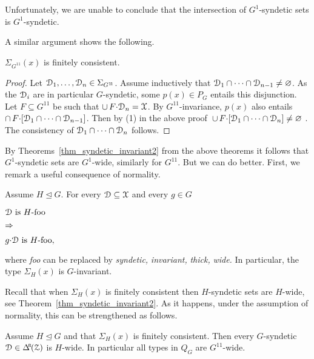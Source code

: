 Unfortunately, we are unable to conclude that the intersection of $G^1$-syndetic sets is $G^1$-syndetic.

A similar argument shows the following.

\begin{theorem}\label{thm_gammaP}
   $\Sigma_{G^{1\!1}}(x)$ is finitely consistent.
\end{theorem}

\begin{proof}
  \def\medrel#1{\parbox[t]{5ex}{$\displaystyle\hfil #1$}}
  \def\ceq#1#2#3{\parbox[t]{23ex}{$\displaystyle #1$}\medrel{#2}{$\displaystyle #3$}}   
  Let $\EuScript D_1,\dots,\EuScript D_n\in\Sigma_{G^{1\!1}}$.
  Assume inductively that $\EuScript D_1\cap\dots\cap\EuScript D_{n-1}\neq\varnothing$.
  As the $\EuScript D_i$ are in particular $G$-syndetic, some $p(x)\in P_G$ entails this disjunction.
  Let $F\subseteq G^{1\!1}$ be such that $\cup\,F{\cdot}\EuScript D_n=\EuScript X$.
  By $G^{1\!1}$-invariance, $p(x)$ also entails $\cap\, F{\cdot}[\EuScript D_1\cap\dots\cap\EuScript D_{n-1}]$.
  Then by (1) in the above proof $\,\cup\,F{\cdot}[\EuScript D_1\cap\dots\cap\EuScript D_n]\neq\varnothing$ .
  The consistency of $\EuScript D_1\cap\dots\cap\EuScript D_n$ follows.
\end{proof}

By Theorems~\ref{thm_syndetic_invariant2} from the above theorems it follows that $G^1$-syndetic sets are $G^1$-wide, similarly for $G^{1\!1}$.
But we can do better.
First, we remark a useful consequence of normality.

\begin{remark}\label{rem_invariance_normalsubg}
\def\medrel#1{\parbox[t]{5ex}{$\displaystyle\hfil #1$}}
\def\ceq#1#2#3{\parbox[t]{20ex}{$\displaystyle #1$}\medrel{#2}{$\displaystyle #3$}}
  Assume $H\trianglelefteq G$.
  For every $\EuScript D\subseteq\EuScript X$ and every $g\in G$ \smallskip
  
  \ceq{\hfill\D\textrm{ is }H\textrm{-foo}}{\Rightarrow}{g{\cdot}\D\textrm{ is }H\textrm{-foo},} \smallskip
  
  where \textit{foo\/} can be replaced by \textit{syndetic,} \textit{invariant,} \textit{thick,} \textit{wide.}
  In particular, the type $\Sigma_H(x)$ is $G$-invariant.
\end{remark}

Recall that when $\Sigma_H(x)$ is finitely consistent then $H$-syndetic sets are $H$-wide, see Theorem~\ref{thm_syndetic_invariant2}.
As it happens, under the assumption of normality, this can be strengthened as follows.

\begin{proposition}\label{prop_Gsyndetic_Hthick1}
  Assume $H\trianglelefteq G$ and that $\Sigma_H(x)$ is finitely consistent.
  Then every $G$-syn\-detic $\D\in\BDelta(\Z)$ is $H$-wide.
  In particular all types in $Q_G$ are $G^{1\!1}$-wide.
\end{proposition}


